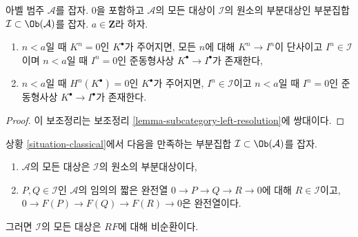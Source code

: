 \begin{lemma}
\label{lemma-subcategory-right-resolution}
아벨 범주 $\mathcal{A}$를 잡자. $0$을 포함하고 $\mathcal{A}$의 모든
대상이 $\mathcal{I}$의 원소의 부분대상인 부분집합
$\mathcal{I} \subset \Ob(\mathcal{A})$를 잡자. $a \in \mathbf{Z}$라 하자.
\begin{enumerate}
\item $n < a$일 때 $K^n = 0$인 $K^\bullet$가 주어지면, 모든 $n$에 대해
$K^n \to I^n$이 단사이고 $I^n \in \mathcal{I}$이며 $n < a$일 때
$I^n = 0$인 준동형사상 $K^\bullet \to I^\bullet$가 존재한다,
\item $n < a$일 때 $H^n(K^\bullet) = 0$인 $K^\bullet$가 주어지면,
$I^n \in \mathcal{I}$이고 $n < a$일 때 $I^n = 0$인 준동형사상
$K^\bullet \to I^\bullet$가 존재한다.
\end{enumerate}
\end{lemma}

\begin{proof}
이 보조정리는 보조정리 \ref{lemma-subcategory-left-resolution}에
쌍대이다.
\end{proof}
\begin{lemma}
\label{lemma-subcategory-right-acyclics}
상황 \ref{situation-classical}에서 다음을 만족하는 부분집합
$\mathcal{I} \subset \Ob(\mathcal{A})$를 잡자.
\begin{enumerate}
\item $\mathcal{A}$의 모든 대상은 $\mathcal{I}$의 원소의 부분대상이다,
\item $P, Q \in \mathcal{I}$인 $\mathcal{A}$의 임의의 짧은 완전열
$0 \to P \to Q \to R \to 0$에 대해 $R \in \mathcal{I}$이고,
$0 \to F(P) \to F(Q) \to F(R) \to 0$은 완전열이다.
\end{enumerate}
그러면 $\mathcal{I}$의 모든 대상은 $RF$에 대해 비순환이다.
\end{lemma}

